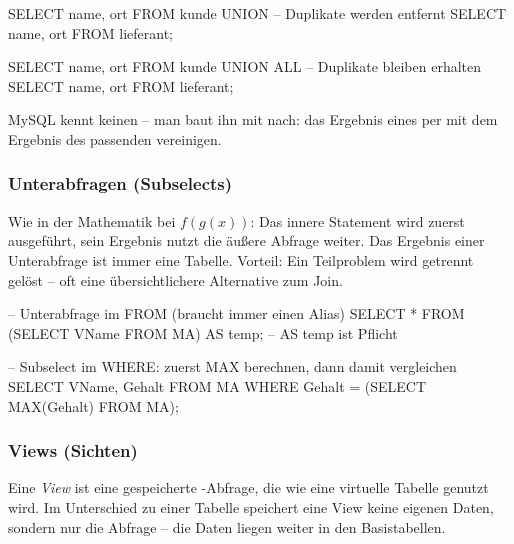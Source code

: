 \begin{syntaxbox}[SQL]
SELECT name, ort FROM kunde
UNION                              -- Duplikate werden entfernt
SELECT name, ort FROM lieferant;

SELECT name, ort FROM kunde
UNION ALL                          -- Duplikate bleiben erhalten
SELECT name, ort FROM lieferant;
\end{syntaxbox}

\begin{infobox}
MySQL kennt keinen  -- man baut ihn mit  nach: das Ergebnis eines  per  mit dem Ergebnis des passenden  vereinigen.
\end{infobox}

\subsubsection{Unterabfragen (Subselects)}
Wie in der Mathematik bei $f(g(x))$: Das innere Statement wird zuerst ausgeführt, sein Ergebnis nutzt die äußere Abfrage weiter. Das Ergebnis einer Unterabfrage ist immer eine Tabelle. Vorteil: Ein Teilproblem wird getrennt gelöst -- oft eine übersichtlichere Alternative zum Join.

\begin{syntaxbox}[SQL]
-- Unterabfrage im FROM (braucht immer einen Alias)
SELECT * FROM
    (SELECT VName FROM MA) AS temp;  -- AS temp ist Pflicht

-- Subselect im WHERE: zuerst MAX berechnen, dann damit vergleichen
SELECT VName, Gehalt FROM MA
WHERE Gehalt = (SELECT MAX(Gehalt) FROM MA);
\end{syntaxbox}

\subsubsection{Views (Sichten)}
Eine \emph{View} ist eine gespeicherte -Abfrage, die wie eine virtuelle Tabelle genutzt wird. Im Unterschied zu einer Tabelle speichert eine View keine eigenen Daten, sondern nur die Abfrage -- die Daten liegen weiter in den Basistabellen.

\begin{procon}
\end{procon}
